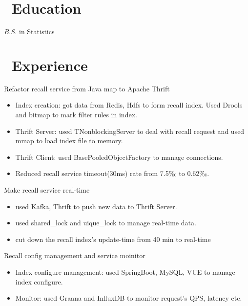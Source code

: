 \documentclass{resume}
\begin{document}



\section{\faGraduationCap\ Education}
\textit{B.S.} in Statistics

\section{\faUsers\ Experience}
Refactor recall service from Java map to Apache Thrift
\begin{itemize}
  \item Index creation: got data from Redis, Hdfs to form recall index. Used Drools and bitmap to mark filter rules in index.
  \item Thrift Server: used TNonblockingServer to deal with recall request and used mmap to load index file to memory.
  \item Thrift Client: used BasePooledObjectFactory to manage connections.
  \item Reduced recall service timeout(30ms) rate from 7.5‰ to 0.62‰.
\end{itemize}

Make recall service real-time
\begin{itemize}
  \item used Kafka, Thrift to push new data to Thrift Server.
  \item used shared_lock and uique_lock to manage real-time data.
  \item cut down the recall index's update-time from 40 min to real-time
\end{itemize}

Recall config management and service moinitor
\begin{itemize}
  \item Index configure management: used SpringBoot, MySQL, VUE to manage index configure.
  \item Monitor: used Graana and InfluxDB to monitor request's QPS, latency etc.
\end{itemize}
\end{document}
